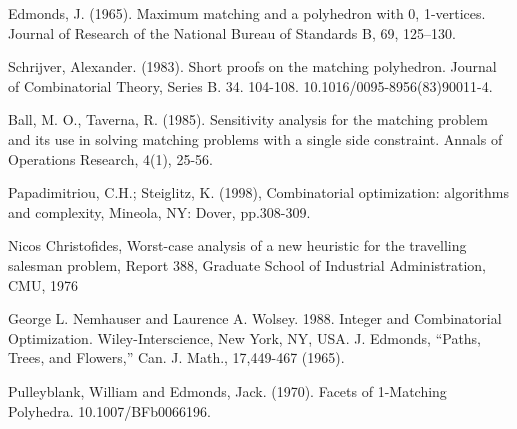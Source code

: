 \documentclass[twoside,a4paper,openright,12pt]{book}
\begin{document}
\newpage
\begin{thebibliography}{9}
Edmonds, J. (1965). Maximum matching and a polyhedron with 0, 1-vertices. Journal of Research of the National Bureau of Standards B, 69, 125--130. 

 
Schrijver, Alexander. (1983). Short proofs on the matching polyhedron. Journal of Combinatorial Theory, Series B. 34. 104-108. 10.1016/0095-8956(83)90011-4. 
 
Ball, M. O.,  Taverna, R. (1985). Sensitivity analysis for the matching problem and its use in solving matching problems with a single side constraint. Annals of Operations Research, 4(1), 25-56.

Papadimitriou, C.H.; Steiglitz, K. (1998), Combinatorial optimization: algorithms and complexity, Mineola, NY: Dover, pp.308-309.

Nicos Christofides, Worst-case analysis of a new heuristic for the travelling salesman problem, Report 388, Graduate School of Industrial Administration, CMU, 1976

George L. Nemhauser and Laurence A. Wolsey. 1988. Integer and Combinatorial Optimization. Wiley-Interscience, New York, NY, USA.
J. Edmonds, “Paths, Trees, and Flowers,” Can. J. Math., 17,449-467 (1965).

Pulleyblank, William and Edmonds, Jack. (1970). Facets of 1-Matching Polyhedra. 10.1007/BFb0066196. 
\end{thebibliography}
\end{document}
